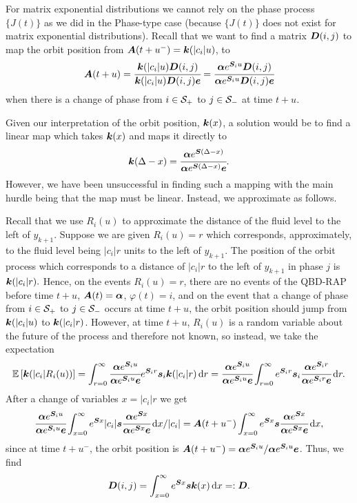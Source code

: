 For matrix exponential distributions we cannot rely on the phase process \(\{J(t)\}\) as we did in the Phase-type case (because \(\{J(t)\}\) does not exist for matrix exponential distributions). Recall that we want to find a matrix \(\boldsymbol D(i,j)\) to map the orbit position from \(\boldsymbol A(t+u^-) = \boldsymbol k(|c_i|u)\), to 
\[\boldsymbol A(t+u) = \cfrac{\boldsymbol k(|c_i|u)\boldsymbol D(i,j)}{\boldsymbol k(|c_i|u)\boldsymbol D(i,j)\boldsymbol e}=\cfrac{\boldsymbol\alpha e^{\boldsymbol S_iu} \boldsymbol D(i,j)}{\boldsymbol\alpha e^{\boldsymbol S_iu}\boldsymbol D(i,j)\boldsymbol e}\]
when there is a change of phase from \(i\in\mathcal{S}_+\) to \(j\in\mathcal{S}_-\) at time \(t+u\). 

Given our interpretation of the orbit position, \(\boldsymbol k(x)\), a solution would be to find a linear map which takes \(\boldsymbol k(x)\) and maps it directly to 
\[\boldsymbol k(\Delta-x) = \cfrac{\boldsymbol\alpha e^{\boldsymbol S(\Delta-x)} }{\boldsymbol\alpha e^{\boldsymbol S(\Delta-x) } \boldsymbol e}.\] However, we have been unsuccessful in finding such a mapping with the main hurdle being that the map must be linear. Instead, we approximate as follows.

Recall that we use \(R_i(u)\) to approximate the distance of the fluid level to the left of \(y_{k+1}\). Suppose we are given \(R_i(u)=r\) which corresponds, approximately, to the fluid level being \(|c_i|r\) units to the left of \(y_{k+1}\). The position of the orbit process which corresponds to a distance of \(|c_i|r\) to the left of \(y_{k+1}\) in phase \(j\) is \(\boldsymbol k(|c_i|r).\)
Hence, on the events \(R_i(u)=r\), there are no events of the QBD-RAP before time \(t+u\), \(\boldsymbol A(t)=\boldsymbol\alpha\), \(\varphi(t)=i\), and on the event that a change of phase from \(i\in\mathcal{S}_+\) to \(j\in\mathcal{S}_-\) occurs at time \(t+u\), the orbit position should jump from \(\boldsymbol k(|c_i|u)\) to \(\boldsymbol k(|c_i|r)\). However, at time \(t+u\), \(R_i(u)\) is a random variable about the future of the process and therefore not known, so instead, we take the expectation 
\[\mathbb E \left[ \boldsymbol k(|c_i|R_i(u))\right] = \int_{r=0}^\infty \cfrac{\boldsymbol\alpha e^{\boldsymbol S_i u } }{\boldsymbol\alpha e^{\boldsymbol S_iu } \boldsymbol e} e^{\boldsymbol S_ir } \boldsymbol s_i \boldsymbol k(|c_i|r)\, \mathrm{d} r = \cfrac{\boldsymbol\alpha e^{\boldsymbol S_i u } }{\boldsymbol\alpha e^{\boldsymbol S_iu } \boldsymbol e} \int_{r=0}^\infty e^{\boldsymbol S_ir } \boldsymbol s_i\cfrac{\boldsymbol\alpha e^{ \boldsymbol S_ir } }{\boldsymbol\alpha e^{ \boldsymbol S_ir } \boldsymbol e}\, \mathrm{d} r.\]
After a change of variables \(x=|c_i|r\) we get 
\[\cfrac{\boldsymbol\alpha e^{\boldsymbol S_i u } }{\boldsymbol\alpha e^{\boldsymbol S_iu } \boldsymbol e} \int_{x=0}^\infty e^{\boldsymbol S x }|c_i| \boldsymbol s \cfrac{\boldsymbol\alpha e^{ \boldsymbol Sx } }{\boldsymbol\alpha e^{ \boldsymbol Sx } \boldsymbol e}\, \mathrm{d} x/|c_i| = \boldsymbol A(t+u^-)\int_{x=0}^\infty e^{\boldsymbol S x }\boldsymbol s \cfrac{\boldsymbol\alpha e^{ \boldsymbol Sx } }{\boldsymbol\alpha e^{ \boldsymbol Sx } \boldsymbol e}\, \mathrm{d} x,\]
since at time \(t+u^-\), the orbit position is \(\boldsymbol A(t+u^-) = {\boldsymbol\alpha e^{\boldsymbol S_i u } }/{\boldsymbol\alpha e^{\boldsymbol S_iu } \boldsymbol e}\). Thus, we find 
\[\boldsymbol D(i,j)=\displaystyle \int_{x=0}^\infty e^{\boldsymbol S x }\boldsymbol s \boldsymbol k(x)\, \mathrm{d} x=:\boldsymbol D.\]

